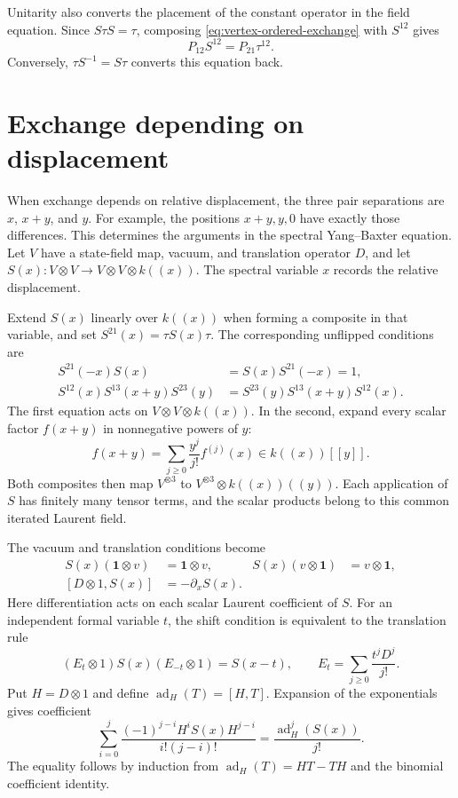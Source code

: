 Unitarity also converts the placement of the constant operator in
the field equation.
Since $S\tau S=\tau$, composing
\eqref{eq:vertex-ordered-exchange} with $S^{12}$ gives
\begin{equation}\label{eq:vertex-other-placement}
 P_{12}S^{12}=P_{21}\tau^{12}.
\end{equation}
Conversely, $\tau S^{-1}=S\tau$ converts this equation back.

\section{Exchange depending on displacement}
\label{sec:vertex-spectral-dictionary}

When exchange depends on relative displacement, the three pair
separations are $x$, $x+y$, and $y$.
For example, the positions $x+y,y,0$ have exactly those differences.
This determines the arguments in the spectral Yang--Baxter equation.
Let $V$ have a state-field map, vacuum, and translation operator $D$, and
let $S(x):V\otimes V\to V\otimes V\otimes k((x))$.
The spectral variable $x$ records the relative displacement.

Extend $S(x)$ linearly over $k((x))$ when forming a composite
in that variable, and set $S^{21}(x)=\tau S(x)\tau$.
The corresponding unflipped conditions are
\begin{align}
 S^{21}(-x)S(x)&=S(x)S^{21}(-x)=1,
 \label{eq:vertex-spectral-unitarity}\\
 S^{12}(x)S^{13}(x+y)S^{23}(y)
   &=S^{23}(y)S^{13}(x+y)S^{12}(x).
 \label{eq:vertex-spectral-yb}
\end{align}
The first equation acts on $V\otimes V\otimes k((x))$.
In the second, expand every scalar factor $f(x+y)$ in
nonnegative powers of $y$:
\[
 f(x+y)=\sum_{j\geq0}\frac{y^j}{j!}f^{(j)}(x)
       \in k((x))[[y]].
\]
Both composites then map $V^{\otimes3}$ to
$V^{\otimes3}\otimes k((x))((y))$.
Each application of $S$ has finitely many tensor terms, and
the scalar products belong to this common iterated Laurent field.

The vacuum and translation conditions become
\[
 \begin{aligned}
 S(x)(\mathbf1\otimes v)&=\mathbf1\otimes v,
 &S(x)(v\otimes\mathbf1)&=v\otimes\mathbf1,\\
 [D\otimes1,S(x)]&=-\partial_xS(x).
 \end{aligned}
\]
Here differentiation acts on each scalar Laurent coefficient of $S$.
For an independent formal variable $t$, the shift condition is
equivalent to the translation rule
\[
 (E_t\otimes1)S(x)(E_{-t}\otimes1)=S(x-t),
 \qquad E_t=\sum_{j\geq0}\frac{t^jD^j}{j!}.
\]
Put $H=D\otimes1$ and define $\operatorname{ad}_H(T)=[H,T]$.
Expansion of the exponentials gives coefficient
\[
 \sum_{i=0}^j\frac{(-1)^{j-i}H^iS(x)H^{j-i}}{i!(j-i)!}
   =\frac{\operatorname{ad}_H^j(S(x))}{j!}.
\]
The equality follows by induction from $\operatorname{ad}_H(T)=HT-TH$
and the binomial coefficient identity.


